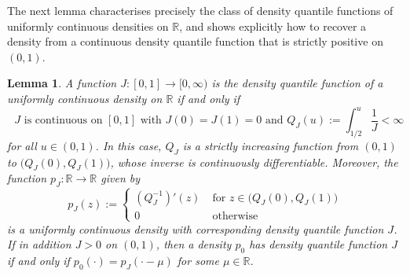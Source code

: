 \documentclass[a4paper]{article}
\newcommand{\R}{\mathbb{R}}
\newtheorem{lemma}[theorem]{Lemma}
\theoremstyle{definition}
\begin{document}
The next lemma characterises precisely the class of density quantile functions of uniformly continuous densities on $\R$, and shows explicitly how to recover a density from a continuous density quantile function that is strictly positive on $(0,1)$.
\begin{lemma}
\label{lem:density-quantile-reverse}
A function $J \colon [0,1] \to [0,\infty)$ is the density quantile function of a uniformly continuous density on $\R$ if and only if
\begin{equation}
\label{eq:quantile-J}
\text{ $J$ is continuous on $[0,1]$ with $J(0) = J(1) = 0$ and }Q_J(u) := \int_{1/2}^u \frac{1}{J} < \infty
\end{equation}
for all $u \in (0,1)$. In this case, $Q_J$ is a strictly increasing function from $(0,1)$ to $\bigl(Q_J(0),Q_J(1)\bigr)$, whose inverse is continuously differentiable. Moreover, the function $p_J \colon \R \to \R$ given by
\[
p_J(z) := 
\begin{cases}
(Q_J^{-1})'(z) \;&\text{for }z \in \bigl(Q_J(0),Q_J(1)\bigr) \\
0 \;&\text{otherwise}
\end{cases}
\]
is a uniformly continuous density with corresponding density quantile function $J$. If in addition $J > 0$ on $(0,1)$, then a density $p_0$ has density quantile function $J$ if and only if $p_0(\cdot) = p_J(\cdot - \mu)$ for some $\mu \in \R$.
\end{lemma}
\end{document}
